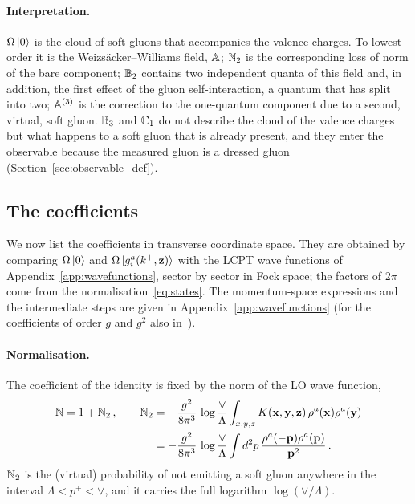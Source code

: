 \paragraph{Interpretation.} $\Omega\ket0$ is the cloud of soft gluons that accompanies the valence charges. To lowest order it is the Weizs\"acker--Williams field, $\mathbb{A}$; $\mathbb{N}_2$ is the corresponding loss of norm of the bare component; $\mathbb{B}_2$ contains two independent quanta of this field and, in addition, the first effect of the gluon self-interaction, a quantum that has split into two; $\mathbb{A}^{(3)}$ is the correction to the one-quantum component due to a second, virtual, soft gluon. $\mathbb{B}_3$ and $\mathbb{C}_1$ do not describe the cloud of the valence charges but what happens to a soft gluon that is already present, and they enter the observable because the measured gluon is a dressed gluon (Section~\ref{sec:observable_def}).

\subsection{The coefficients}\label{sec:coefficients}

We now list the coefficients in transverse coordinate space. They are obtained by comparing $\Omega\ket0$ and $\Omega\ket{g^a_i(k^+,\mathbf{z})}$ with the LCPT wave functions of Appendix~\ref{app:wavefunctions}, sector by sector in Fock space; the factors of $2\pi$ come from the normalisation~\eqref{eq:states}. The momentum-space expressions and the intermediate steps are given in Appendix~\ref{app:wavefunctions} (for the coefficients of order $g$ and $g^2$ also in~\cite{Radhakrishnan:2026soft}).

\paragraph{Normalisation.} The coefficient of the identity is fixed by the norm of the LO wave function,
\begin{align}\label{eq:N2}
\mathbb{N}=1+\mathbb{N}_2\,,\qquad
\mathbb{N}_2&=-\frac{g^2}{8\pi^3}\,\log\frac{\vee}{\Lambda}\int_{x,y,z}K(\mathbf{x},\mathbf{y},\mathbf{z})\,\rho^a(\mathbf{x})\rho^a(\mathbf{y})
\notag\\&=-\frac{g^2}{8\pi^3}\,\log\frac{\vee}{\Lambda}\int d^2p\,\frac{\rho^a(-\mathbf{p})\rho^a(\mathbf{p})}{\mathbf{p}^2}\,.
\end{align}
$\mathbb{N}_2$ is the (virtual) probability of not emitting a soft gluon anywhere in the interval $\Lambda<p^+<\vee$, and it carries the full logarithm $\log(\vee/\Lambda)$.

